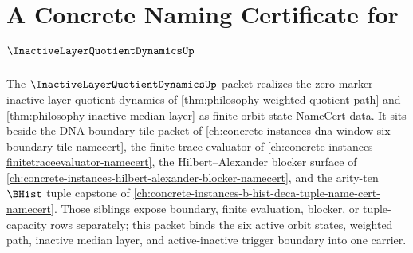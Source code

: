 \chapter{A Concrete Naming Certificate for $\InactiveLayerQuotientDynamicsUp$}
\label{ch:concrete-instances-inactive-layer-quotient-dynamics-namecert}

The $\InactiveLayerQuotientDynamicsUp$ packet realizes the zero-marker inactive-layer quotient dynamics of \autoref{thm:philosophy-weighted-quotient-path} and \autoref{thm:philosophy-inactive-median-layer} as finite orbit-state NameCert data. It sits beside the DNA boundary-tile packet of \autoref{ch:concrete-instances-dna-window-six-boundary-tile-namecert}, the finite trace evaluator of \autoref{ch:concrete-instances-finitetraceevaluator-namecert}, the Hilbert--Alexander blocker surface of \autoref{ch:concrete-instances-hilbert-alexander-blocker-namecert}, and the arity-ten $\BHist$ tuple capstone of \autoref{ch:concrete-instances-b-hist-deca-tuple-name-cert-namecert}. Those siblings expose boundary, finite evaluation, blocker, or tuple-capacity rows separately; this packet binds the six active orbit states, weighted path, inactive median layer, and active-inactive trigger boundary into one carrier.

